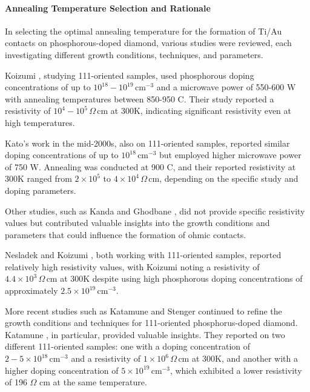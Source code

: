 \paragraph{Annealing Temperature Selection and Rationale}
In selecting the optimal annealing temperature for the formation of Ti/Au contacts on phosphorous-doped diamond, various studies were reviewed, each investigating different growth conditions, techniques, and parameters.

Koizumi \cite{koizumi2000}, studying 111-oriented samples, used phosphorous doping concentrations of up to \(10^{18} - 10^{19} \, \text{cm}^{-3}\) and a microwave power of 550-600 W with annealing temperatures between 850-950 C. Their study reported a resistivity of \(10^{4} - 10^{5} \, \Omega \, \text{cm}\) at 300K, indicating significant resistivity even at high temperatures.

Kato's work \cite{kato2005} in the mid-2000s, also on 111-oriented samples, reported similar doping concentrations of up to \(10^{18} \, \text{cm}^{-3}\) but employed higher microwave power of 750 W. Annealing was conducted at 900 C, and their reported resistivity at 300K ranged from \(2 \times 10^{5}\) to \(4 \times 10^{4} \, \Omega \, \text{cm}\), depending on the specific study and doping parameters.

Other studies, such as Kanda \cite{kanda2003} and Ghodbane \cite{ghodbane2008}, did not provide specific resistivity values but contributed valuable insights into the growth conditions and parameters that could influence the formation of ohmic contacts.

Nesladek \cite{nesladek2003} and Koizumi \cite{koizumi1997}, both working with 111-oriented samples, reported relatively high resistivity values, with Koizumi \cite{koizumi1997} noting a resistivity of \(4.4 \times 10^{3} \, \Omega \, \text{cm}\) at 300K despite using high phosphorous doping concentrations of approximately \(2.5 \times 10^{19} \, \text{cm}^{-3}\).

More recent studies such as Katamune \cite{katamune2020} and Stenger \cite{stenger2013} continued to refine the growth conditions and techniques for 111-oriented phosphorus-doped diamond. Katamune \cite{katamune2020}, in particular, provided valuable insights. They reported on two different 111-oriented samples: one with a doping concentration of \(2-5 \times 10^{18} \, \text{cm}^{-3}\) and a resistivity of \(1 \times 10^{6} \, \Omega \, \text{cm}\) at 300K, and another with a higher doping concentration of \(5 \times 10^{19} \, \text{cm}^{-3}\), which exhibited a lower resistivity of 196 $\Omega$ cm at the same temperature.

